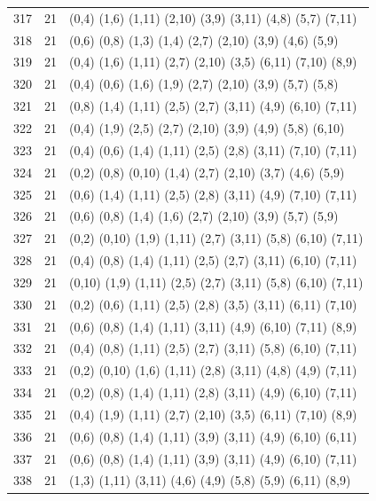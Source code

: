 \begin{appendix}
{\begin{longtable}{lll}
317& 21 & (0,4)   (1,6)  (1,11) (2,10)  (3,9)   (3,11)  (4,8)   (5,7)   (7,11)\\
318& 21 & (0,6)   (0,8)  (1,3)  (1,4)   (2,7)   (2,10)  (3,9)   (4,6)   (5,9)\\
319& 21 & (0,4)   (1,6)  (1,11) (2,7)   (2,10)  (3,5)   (6,11)  (7,10)  (8,9)\\
320& 21 & (0,4)   (0,6)  (1,6)  (1,9)   (2,7)   (2,10)  (3,9)   (5,7)   (5,8)\\
321& 21 & (0,8)   (1,4)  (1,11) (2,5)   (2,7)   (3,11)  (4,9)   (6,10)  (7,11)\\
322& 21 & (0,4)   (1,9)  (2,5)  (2,7)   (2,10)  (3,9)   (4,9)   (5,8)   (6,10)\\
323& 21 & (0,4)   (0,6)  (1,4)  (1,11)  (2,5)   (2,8)   (3,11)  (7,10)  (7,11)\\
324& 21 & (0,2)   (0,8)  (0,10) (1,4)   (2,7)   (2,10)  (3,7)   (4,6)   (5,9)\\
325& 21 & (0,6)   (1,4)  (1,11) (2,5)   (2,8)   (3,11)  (4,9)   (7,10)  (7,11)\\
326& 21 & (0,6)   (0,8)  (1,4)  (1,6)   (2,7)   (2,10)  (3,9)   (5,7)   (5,9)\\
327& 21 & (0,2)   (0,10) (1,9)  (1,11)  (2,7)   (3,11)  (5,8)   (6,10)  (7,11)\\
328& 21 & (0,4)   (0,8)  (1,4)  (1,11)  (2,5)   (2,7)   (3,11)  (6,10)  (7,11)\\
329& 21 & (0,10)  (1,9)  (1,11) (2,5)   (2,7)   (3,11)  (5,8)   (6,10)  (7,11)\\
330& 21 & (0,2)   (0,6)  (1,11) (2,5)   (2,8)   (3,5)   (3,11)  (6,11)  (7,10)\\
331& 21 & (0,6)   (0,8)  (1,4)  (1,11)  (3,11)  (4,9)   (6,10)  (7,11)  (8,9)\\
332& 21 & (0,4)   (0,8)  (1,11) (2,5)   (2,7)   (3,11)  (5,8)   (6,10)  (7,11)\\
333& 21 & (0,2)   (0,10) (1,6)  (1,11)  (2,8)   (3,11)  (4,8)   (4,9)   (7,11)\\
334& 21 & (0,2)   (0,8)  (1,4)  (1,11)  (2,8)   (3,11)  (4,9)   (6,10)  (7,11)\\
335& 21 & (0,4)   (1,9)  (1,11) (2,7)   (2,10)  (3,5)   (6,11)  (7,10)  (8,9)\\
336& 21 & (0,6)   (0,8)  (1,4)  (1,11)  (3,9)   (3,11)  (4,9)   (6,10)  (6,11)\\
337& 21 & (0,6)   (0,8)  (1,4)  (1,11)  (3,9)   (3,11)  (4,9)   (6,10)  (7,11)\\
338& 21 & (1,3)   (1,11) (3,11) (4,6)   (4,9)   (5,8)   (5,9)   (6,11)  (8,9)\\

\end{longtable}}
\end{appendix}
